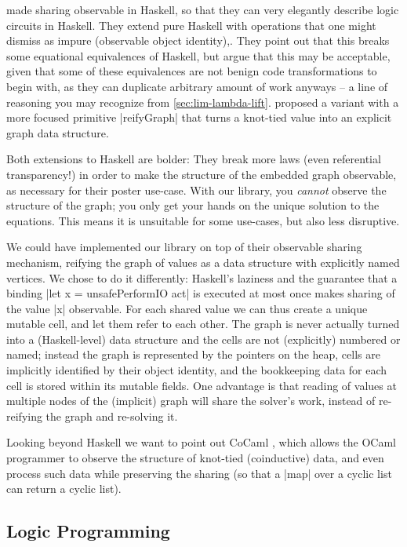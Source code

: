 \documentclass[manuscript,screen,acmsmall,nonacm]{acmart}
\begin{document}
 made sharing observable in Haskell, so that they can very elegantly describe logic circuits in Haskell. They extend pure Haskell with operations that one might dismiss as impure (observable object identity),. They point out that this breaks some equational equivalences of Haskell, but argue that this may be acceptable, given that some of these equivalences  are not benign code transformations to begin with, as they can duplicate arbitrary amount of work anyways -- a line of reasoning you may recognize from \cref{sec:lim-lambda-lift}.  proposed a variant with a more focused primitive |reifyGraph| that turns a knot-tied value into an explicit graph data structure.

Both extensions to Haskell are bolder: They break more laws (even referential transparency!) in order to make the structure of the embedded graph observable, as necessary for their poster use-case. With our library, you \emph{cannot} observe the structure of the graph; you only get your hands on the unique solution to the equations. This means it is unsuitable for some use-cases, but also less disruptive.

We could have implemented our library on top of their observable sharing mechanism, reifying the graph of values as a data structure with explicitly named vertices. We chose to do it differently: Haskell's laziness and the guarantee that a binding |let x = unsafePerformIO act| is executed at most once makes sharing of the value |x| observable. For each shared value we can thus create a unique mutable cell, and let them refer to each other.
The graph is never actually turned into a (Haskell-level) data structure and the cells are not (explicitly) numbered or named; instead the graph is represented by the pointers on the heap, cells are implicitly identified by their object identity, and the bookkeeping data for each cell is stored within its mutable fields. One advantage is that reading of values at multiple nodes of the (implicit) graph will share the solver's work, instead of re-reifying the graph and re-solving it.

Looking beyond Haskell we want to point out CoCaml \citep{cocaml}, which allows the OCaml programmer to observe the structure of knot-tied (coinductive) data, and even process such data while preserving the sharing (so that a |map| over a cyclic list can return a cyclic list).


\subsection{Logic Programming}
\end{document}
